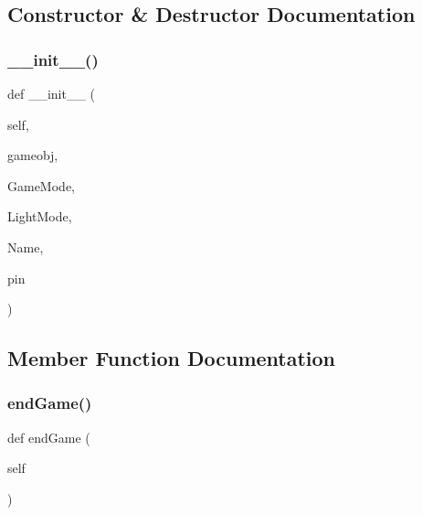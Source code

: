 \subsection{Constructor \& Destructor Documentation}
\hypertarget{classgame_1_1_player_1_1player_a027a09f90ea572dba24b1b7840c0ddf2}{}\label{classgame_1_1_player_1_1player_a027a09f90ea572dba24b1b7840c0ddf2} 
\subsubsection{\texorpdfstring{\+\_\+\+\_\+init\+\_\+\+\_\+()}{\_\_init\_\_()}}
{\footnotesize\ttfamily def \+\_\+\+\_\+init\+\_\+\+\_\+ (\begin{DoxyParamCaption}\item[{}]{self,  }\item[{}]{gameobj,  }\item[{}]{Game\+Mode,  }\item[{}]{Light\+Mode,  }\item[{}]{Name,  }\item[{}]{pin }\end{DoxyParamCaption})}



\subsection{Member Function Documentation}
\hypertarget{classgame_1_1_player_1_1player_abb1fe44b5f3819007f0e499019e915e3}{}\label{classgame_1_1_player_1_1player_abb1fe44b5f3819007f0e499019e915e3} 
\subsubsection{\texorpdfstring{end\+Game()}{endGame()}}
{\footnotesize\ttfamily def end\+Game (\begin{DoxyParamCaption}\item[{}]{self }\end{DoxyParamCaption})}

\hypertarget{classgame_1_1_player_1_1player_a9747e45f935d296c2c0b508127fd7c4a}{}\label{classgame_1_1_player_1_1player_a9747e45f935d296c2c0b508127fd7c4a} 
